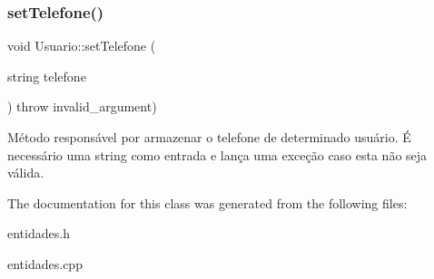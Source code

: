 \subsubsection{\texorpdfstring{set\+Telefone()}{setTelefone()}}
{\footnotesize\ttfamily void Usuario\+::set\+Telefone (\begin{DoxyParamCaption}\item[{string}]{telefone }\end{DoxyParamCaption}) throw  invalid\+\_\+argument) }

Método responsável por armazenar o telefone de determinado usuário. É necessário uma string como entrada e lança uma exceção caso esta não seja válida. 

The documentation for this class was generated from the following files\+:\begin{DoxyCompactItemize}
\item 
entidades.\+h\item 
entidades.\+cpp\end{DoxyCompactItemize}
